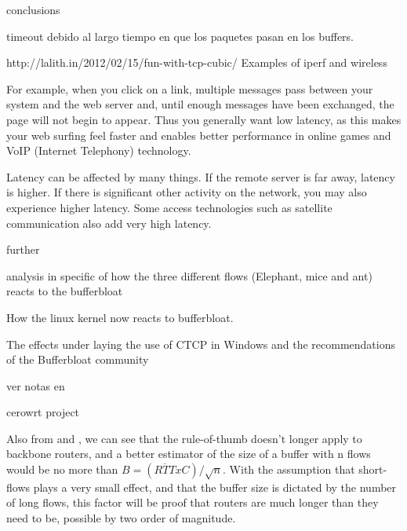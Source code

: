 conclusions

timeout debido al largo tiempo en que los paquetes pasan en los buffers.


http://lalith.in/2012/02/15/fun-with-tcp-cubic/
Examples of iperf and wireless 

\cite{MathisMacroCAA}

For example, when you click on a link, multiple messages pass between your system and the web server and, until enough messages have been exchanged, the page will not begin to appear. Thus you generally want low latency, as this makes your web surfing feel faster and enables better performance in online games and VoIP (Internet Telephony) technology.

Latency can be affected by many things. If the remote server is far away, latency is higher. If there is significant other activity on the network, you may also experience higher latency. Some access technologies such as satellite communication also add very high latency.



further

analysis in specific of how the three different flows (Elephant, mice and ant)\cite{HaElephants} \cite{evolvshortlongflows} reacts to the bufferbloat

How the linux kernel now reacts to bufferbloat. \cite{TokeLinux}

The effects under laying the use of CTCP\cite{Tan06compoundtcp}\cite{4146841} in Windows and the recommendations of the Bufferbloat community\cite{windowstips}

ver notas en \cite{MathisMacroCAA}

cerowrt project \cite{cerowrt}

Also from \cite{main:ref:1} and \cite{Vu-Brugier}, we can see that the rule-of-thumb doesn't longer apply to backbone routers, and a better estimator of the size of a buffer with n flows would be no more than $B = (\overline{RTT}xC)/\sqrt{n}$. With the assumption that short-flows plays a very small effect, and that the buffer size is dictated by the number of long flows, this factor will be proof that routers are much longer than they need to be, possible by two order of magnitude.